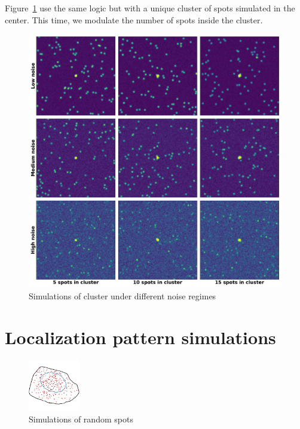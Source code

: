 \newpage

\null
\vfill

\noindent
Figure~\ref{fig:cluster_mosaic} use the same logic but with a unique cluster of spots simulated in the center.
This time, we modulate the number of spots inside the cluster.

\vfill

\begin{figure}[h]
    \centering
    \includegraphics[width=\textwidth]{figures/appendix/cluster_mosaic}
    \caption[Simulations of clusters under different noise regimes]{Simulations of cluster under different noise regimes}
    \label{fig:cluster_mosaic}
\end{figure}

\newpage

\section{Localization pattern simulations}
\label{sec:appendix_simulations_pattern}

\vfill

\begin{figure}[h]
    \centering
    \includegraphics[width=0.2\textwidth]{figures/appendix/random_1_300}
    \caption[Simulation of random pattern]{Simulations of random spots}
    \label{fig:random_1_300}
\end{figure}

